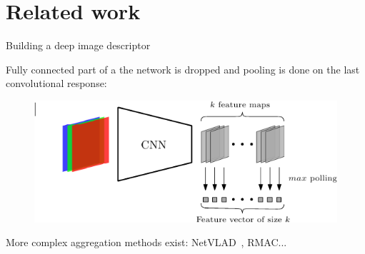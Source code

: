 \section{Related work}

\label{sec:related_work}

\begin{frame}{Building a deep image descriptor}

	Fully connected part of a the network is dropped and pooling is done on the last convolutional response:
	\vfill
	\begin{figure}
		\centering
		\includegraphics[width=0.8\linewidth, trim = 2cm 0 0 0]{vect/MAC.pdf}			
	\end{figure}
	\vfill
	More complex aggregation methods exist: NetVLAD~\cite{Arandjelovic2017}, RMAC...
\end{frame}

